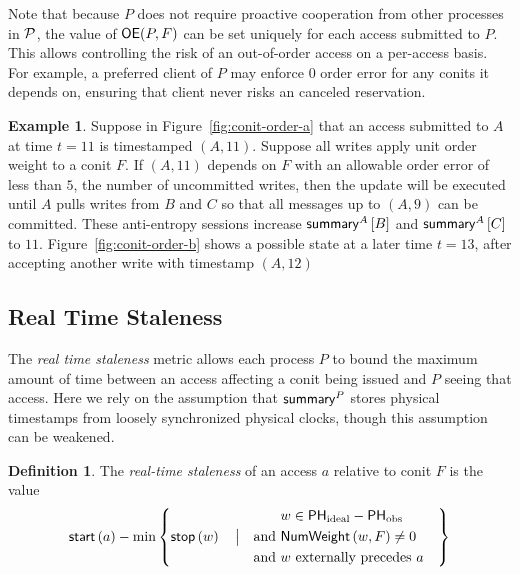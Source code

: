 \documentclass[]             %
{NASA}                       %
\theoremstyle{definition}
\newtheorem{example}[theorem]{Example}
\newtheorem{definition}[theorem]{Definition}
\begin{document}
Note that because $P$ does not require proactive cooperation from
other processes in $\mathcal{P}$, the value of $\mathsf{OE}(P, F)$ can be set
uniquely for each access submitted to $P$. This allows controlling the
risk of an out-of-order access on a per-access basis. For example, a
preferred client of $P$ may enforce $0$ order error for any conits it
depends on, ensuring that client never risks an canceled reservation.

\begin{example}
  Suppose in Figure~\ref{fig:conit-order-a} that an access submitted
  to $A$ at time $t = 11$ is timestamped $(A, 11)$. Suppose all writes
  apply unit order weight to a conit $F$. If $(A, 11)$ depends on $F$
  with an allowable order error of less than $5$, the number of
  uncommitted writes, then the update will be executed until $A$ pulls
  writes from $B$ and $C$ so that all messages up to $(A, 9)$ can be
  committed. These anti-entropy sessions increase $\mathsf{summary}^{A}\left[B\right]$ and
  $\mathsf{summary}^{A}\left[C\right]$ to $11$.  Figure~\ref{fig:conit-order-b} shows a
  possible state at a later time $t = 13$, after accepting another
  write with timestamp $(A, 12)$
\end{example}


\subsection{Real Time Staleness}
\label{ssec:conit-real-time-consistency}
The \emph{real time staleness} metric allows each process $P$ to bound
the maximum amount of time between an access affecting a conit being
issued and $P$ seeing that access. Here we rely on the assumption that
$\mathsf{summary}^{P}$ stores physical timestamps from loosely synchronized
physical clocks, though this assumption can be weakened.

\begin{definition}
  The \emph{real-time staleness} of an access $a$ relative to conit
  $F$ is the value
  \begin{equation*}
    \mathsf{start}\left(a\right) - \min \left\{\mathsf{stop}\left(w\right) \quad \big|\quad
      \begin{aligned}&w \in \mathsf{PH}_{\mathrm{ideal}}-\mathsf{PH}_{\mathrm{obs}} \\
                     \textrm{and } &\mathsf{NumWeight}\left(w, F\right) \neq 0 \\
                     \textrm{and } &\textrm{$w$ externally precedes $a$}
    \end{aligned}\quad \right\}
  \end{equation*}
\end{definition}
\end{document}

